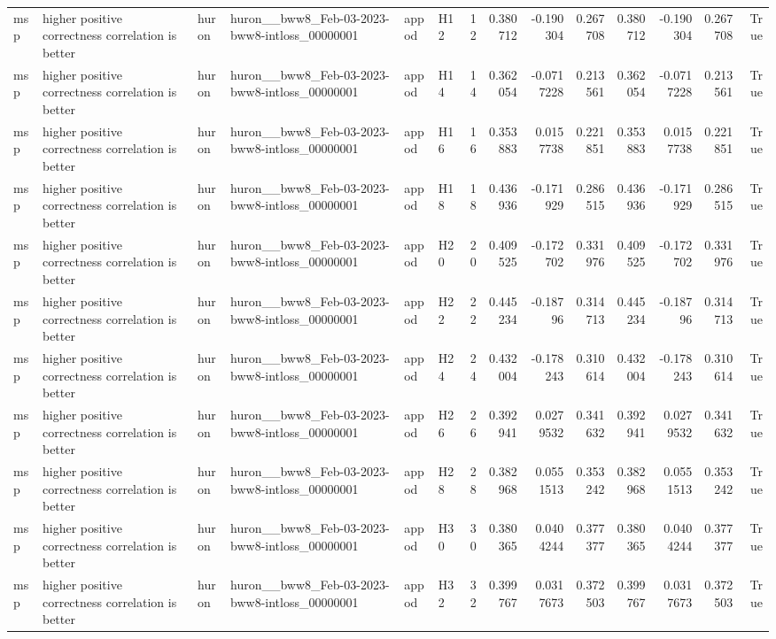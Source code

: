 \begin{longtable}{llllllrrrrrrrr}
msp & higher positive correctness correlation is better & huron & huron\_\_bww8\_Feb-03-2023-bww8-intloss\_00000001 & appod & H12 & 12 & 0.380712 & -0.190304 & 0.267708 & 0.380712 & -0.190304 & 0.267708 & True \\
msp & higher positive correctness correlation is better & huron & huron\_\_bww8\_Feb-03-2023-bww8-intloss\_00000001 & appod & H14 & 14 & 0.362054 & -0.0717228 & 0.213561 & 0.362054 & -0.0717228 & 0.213561 & True \\
msp & higher positive correctness correlation is better & huron & huron\_\_bww8\_Feb-03-2023-bww8-intloss\_00000001 & appod & H16 & 16 & 0.353883 & 0.0157738 & 0.221851 & 0.353883 & 0.0157738 & 0.221851 & True \\
msp & higher positive correctness correlation is better & huron & huron\_\_bww8\_Feb-03-2023-bww8-intloss\_00000001 & appod & H18 & 18 & 0.436936 & -0.171929 & 0.286515 & 0.436936 & -0.171929 & 0.286515 & True \\
msp & higher positive correctness correlation is better & huron & huron\_\_bww8\_Feb-03-2023-bww8-intloss\_00000001 & appod & H20 & 20 & 0.409525 & -0.172702 & 0.331976 & 0.409525 & -0.172702 & 0.331976 & True \\
msp & higher positive correctness correlation is better & huron & huron\_\_bww8\_Feb-03-2023-bww8-intloss\_00000001 & appod & H22 & 22 & 0.445234 & -0.18796 & 0.314713 & 0.445234 & -0.18796 & 0.314713 & True \\
msp & higher positive correctness correlation is better & huron & huron\_\_bww8\_Feb-03-2023-bww8-intloss\_00000001 & appod & H24 & 24 & 0.432004 & -0.178243 & 0.310614 & 0.432004 & -0.178243 & 0.310614 & True \\
msp & higher positive correctness correlation is better & huron & huron\_\_bww8\_Feb-03-2023-bww8-intloss\_00000001 & appod & H26 & 26 & 0.392941 & 0.0279532 & 0.341632 & 0.392941 & 0.0279532 & 0.341632 & True \\
msp & higher positive correctness correlation is better & huron & huron\_\_bww8\_Feb-03-2023-bww8-intloss\_00000001 & appod & H28 & 28 & 0.382968 & 0.0551513 & 0.353242 & 0.382968 & 0.0551513 & 0.353242 & True \\
msp & higher positive correctness correlation is better & huron & huron\_\_bww8\_Feb-03-2023-bww8-intloss\_00000001 & appod & H30 & 30 & 0.380365 & 0.0404244 & 0.377377 & 0.380365 & 0.0404244 & 0.377377 & True \\
msp & higher positive correctness correlation is better & huron & huron\_\_bww8\_Feb-03-2023-bww8-intloss\_00000001 & appod & H32 & 32 & 0.399767 & 0.0317673 & 0.372503 & 0.399767 & 0.0317673 & 0.372503 & True \\

\end{longtable}
